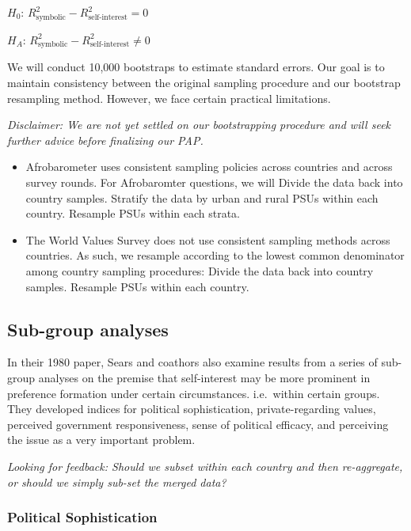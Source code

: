 \documentclass[]{article}
\begin{document}
\(H_0\): \(R^2_{\text{symbolic}} - R^2_{\text{self-interest}} = 0\)

\(H_A\): \(R^2_{\text{symbolic}} - R^2_{\text{self-interest}} \neq 0\)

We will conduct 10,000 bootstraps to estimate standard errors. Our goal
is to maintain consistency between the original sampling procedure and
our bootstrap resampling method. However, we face certain practical
limitations.

\textit{Disclaimer: We are not yet settled on our bootstrapping procedure and will seek further advice before finalizing our PAP.}

\begin{itemize}
  \item Afrobarometer uses consistent sampling policies across countries and across survey rounds. For Afrobaromter questions, we will
  \subitem Divide the data back into country samples.
  \subitem Stratify the data by urban and rural PSUs within each country.
  \subitem Resample PSUs within each strata.
  \item The World Values Survey does not use consistent sampling methods across countries. As such, we resample according to the lowest common denominator among country sampling procedures:
  \subitem Divide the data back into country samples.
  \subitem Resample PSUs within each country.
\end{itemize}

\subsection{Sub-group analyses}\label{sub-group-analyses}

In their 1980 paper, Sears and coathors also examine results from a
series of sub-group analyses on the premise that self-interest may be
more prominent in preference formation under certain circumstances.
i.e.~within certain groups. They developed indices for political
sophistication, private-regarding values, perceived government
responsiveness, sense of political efficacy, and perceiving the issue as
a very important problem.

\textit{Looking for feedback: Should we subset within each country and then re-aggregate, or should we simply sub-set the merged data?}

\subsubsection{Political Sophistication}\label{political-sophistication}
\end{document}
